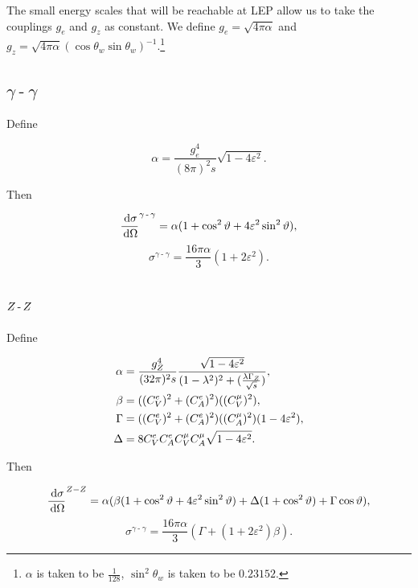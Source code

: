 \documentclass[]{article}
\begin{document}
The small energy scales that will be reachable at LEP allow us to take the couplings $g_{e}$ and $g_{z}$ as constant. We define $g_{e}=\sqrt{4\pi\alpha}$ and $g_{z}=\sqrt{4\pi\alpha}(\cos{\theta_{w}}\sin{\theta_{w}})^{-1}$.\footnote{$\alpha$ is taken to be $\frac{1}{128}$, $\sin^{2}{\theta_{w}}$ is taken to be $0.23152$.}

\subsection{$\gamma\operatorname{-}\gamma$}

Define

$$
\alpha = \frac{g_{e}^{4}}{(8\pi)^{2}s} \sqrt{1-4\varepsilon^{2}}.
$$

Then

$$
\frac{\,\operatorname{d}\!{\sigma}}{\,\operatorname{d}\!{\Omega}}^{\gamma\operatorname{-}\gamma} = \alpha (1 + \cos^{2}{\vartheta} + 4\varepsilon^{2}\sin^{2}{\vartheta}),
$$
\begin{equation}
\sigma^{\gamma\operatorname{-}\gamma} = \frac{16\pi\alpha}{3}(1 + 2\varepsilon^{2}).
\end{equation}

\subsection{$Z \operatorname{-}Z $}

Define

\begin{align*}
\alpha &= \frac{g_{\Zzero}^{4}}{(32\pi)^{2}s} \frac{\sqrt{1-4\varepsilon^{2}}}{(1-\lambda^{2})^{2} + (\frac{\lambda\GZ}{\rts})},
\\
\beta &= ((C_{V}^{e})^{2} + (C_{A}^{e})^{2})((C_{V}^{\mu})^{2}),
\\
\Gamma &= ((C_{V}^{e})^{2} + (C_{A}^{e})^{2})((C_{A}^{\mu})^{2})(1-4\varepsilon^{2}),
\\
\Delta &= 8C_{V}^{e}C_{A}^{e}C_{V}^{\mu}C_{A}^{\mu}\sqrt{1-4\varepsilon^{2}}.
\end{align*}

Then

$$
\frac{\,\operatorname{d}\!{\sigma}}{\,\operatorname{d}\!{\Omega}}^{Z -Z }
  = \alpha(\beta(1+\cos^{2}{\vartheta}+4\varepsilon^{2}\sin^{2}{\vartheta})
    + \Delta(1+\cos^{2}{\vartheta})
    + \Gamma\cos{\vartheta}
  ),
$$
\begin{equation}
\sigma^{\gamma\operatorname{-}\gamma} = \frac{16\pi\alpha}{3}(\Gamma + (1 + 2\varepsilon^{2})\beta).
\end{equation}
\end{document}
